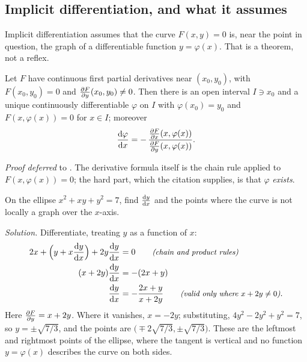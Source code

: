 \subsection{Implicit differentiation, and what it assumes}

Implicit differentiation assumes that the curve $F(x,y)=0$ is, near the point
in question, the graph of a differentiable function $y = \varphi(x)$. That is a
theorem, not a reflex.

\begin{theorem}\label{thm:ch00-ift}
Let $F$ have continuous first partial derivatives near $(x_0,y_0)$, with
$F(x_0,y_0) = 0$ and $\frac{\partial F}{\partial y}(x_0,y_0)\neq 0$. Then there is an open
interval $I\ni x_0$ and a unique continuously differentiable $\varphi$ on $I$
with $\varphi(x_0)=y_0$ and $F(x,\varphi(x)) = 0$ for $x\in I$; moreover
\[
  \frac{\mathrm{d}\varphi}{\mathrm{d}x} = -\,\frac{\frac{\partial F}{\partial x}(x,\varphi(x))}{\frac{\partial F}{\partial y}(x,\varphi(x))}.
\]
\end{theorem}
\noindent\emph{Proof deferred} to \textcite[Thm.~9.28]{Rudin}.
The derivative formula itself is the chain rule applied to
$F(x,\varphi(x)) = 0$; the hard part, which the citation supplies, is that
$\varphi$ \emph{exists}.

\begin{example}\label{ex:ch00-implicit}
On the ellipse $x^2 + xy + y^2 = 7$, find $\frac{\mathrm{d}y}{\mathrm{d}x}$ and the points where
the curve is not locally a graph over the $x$-axis.

\emph{Solution.} Differentiate, treating $y$ as a function of $x$:
\begin{align*}
  2x + \Bigl(y + x\frac{\mathrm{d}y}{\mathrm{d}x}\Bigr) + 2y\frac{\mathrm{d}y}{\mathrm{d}x} &= 0 \qquad\text{\small\itshape(chain and product rules)}\\
  (x + 2y)\frac{\mathrm{d}y}{\mathrm{d}x} &= -(2x + y)\\
  \frac{\mathrm{d}y}{\mathrm{d}x} &= -\frac{2x+y}{x+2y} \qquad\text{\small\itshape(valid only where $x + 2y\neq 0$)}.
\end{align*}
Here $\frac{\partial F}{\partial y} = x + 2y$. Where it vanishes, $x = -2y$; substituting,
$4y^2 - 2y^2 + y^2 = 7$, so $y = \pm\sqrt{7/3}$, and the points are
$\bigl(\mp 2\sqrt{7/3}, \pm\sqrt{7/3}\bigr)$. These are the leftmost and
rightmost points of the ellipse, where the tangent is vertical and no function
$y=\varphi(x)$ describes the curve on both sides.
\end{example}

